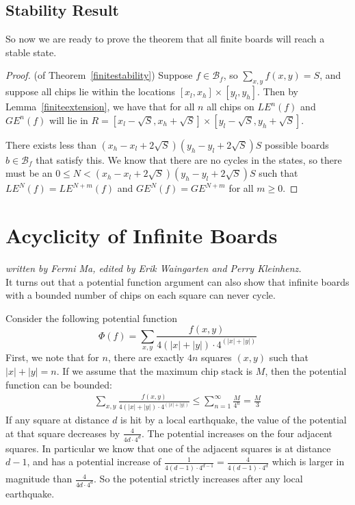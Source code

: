 \documentclass[runningheads,a4paper]{llncs}
\begin{document}
\subsection{Stability Result}
So now we are ready to prove the theorem that all finite boards will reach a stable state. 

\begin{proof}
(of Theorem~\ref{finitestability}) Suppose $f \in \mathcal{B}_f$, so $\sum_{x,y} f(x,y) = S$, and suppose all chips lie within the locations $[x_l, x_h] \times [y_l, y_h]$. Then by Lemma~\ref{finiteextension}, we have that for all $n$ all chips on $LE^n(f)$ and $GE^n(f)$ will lie in $R = [x_l - \sqrt{S}, x_h + \sqrt{S}] \times [y_l - \sqrt{S}, y_h + \sqrt{S}]$. 

There exists less than $(x_h - x_l + 2\sqrt{S})(y_h - y_l + 2\sqrt{S})S$ possible boards $b \in \mathcal{B}_f$ that satisfy this. We know that there are no cycles in the states, so there must be an $0 \leq N < (x_h - x_l + 2\sqrt{S})(y_h - y_l + 2\sqrt{S})S$ such that $LE^N(f) = LE^{N+m}(f)$ and $GE^N(f)=GE^{N+m}$ for all $m \geq 0$.
\end{proof}

\section{Acyclicity of Infinite Boards}
\label{Acyclicity of Infinite Boards}

\emph{written by Fermi Ma, edited by Erik Waingarten and Perry Kleinhenz.}\\


It turns out that a potential function argument can also show that infinite boards with a bounded number of chips on each square can never cycle.

Consider the following potential function
\[ \Phi(f) = \sum_{x,y}\frac{f(x,y)}{4(|x|+|y|)\cdot4^{(|x|+|y|)}} \]
First, we note that for $n$, there are exactly $4n$ squares $(x,y)$ such that $|x| + |y| = n$. If we assume that the maximum chip stack is $M$, then the potential function can be bounded:
\begin{align*}
\sum_{x,y}\frac{f(x,y)}{4(|x|+|y|)\cdot4^{(|x|+|y|)}} \leq \sum_{n=1}^\infty \frac{M}{4^n} = \frac{M}{3}
\end{align*}
If any square at distance $d$ is hit by a local earthquake, the value of the potential at that square decreases by $\frac{4}{4d\cdot 4^d}$. The potential increases on the four adjacent squares. In particular we know that one of the adjacent squares is at distance $d-1$, and has a potential increase of $\frac{1}{4(d-1)\cdot 4^{d-1}} = \frac{4}{4(d-1)\cdot 4^d}$ which is larger in magnitude than $\frac{4}{4d\cdot 4^d}$. So the potential strictly increases after any local earthquake.
\end{document}
